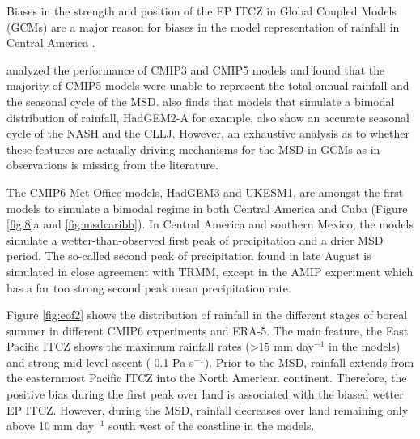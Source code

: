 Biases in the strength and position of the EP ITCZ in Global Coupled Models (GCMs) \citep{bellucci2010,li2014,schneider2014} are a major reason for biases in the model representation of rainfall in Central America  \citep{rauscher2008}. 

\cite{ryu2014} analyzed the performance of CMIP3 and CMIP5 models and found that the majority of CMIP5 models were unable to represent the total annual rainfall and the seasonal cycle of the MSD. \cite{ryu2014} also finds that models that simulate a bimodal distribution of rainfall, HadGEM2-A for example, also show an accurate seasonal cycle of the NASH and the CLLJ. However, an exhaustive analysis as to whether these features are actually driving mechanisms for the MSD in GCMs as in observations is missing from the literature. 


The CMIP6 Met Office models, HadGEM3 and UKESM1, are amongst the first models to simulate a bimodal regime in both Central America and Cuba (Figure \ref{fig:8}a and \ref{fig:msdcaribb}). 
In Central America and southern Mexico, the models simulate a wetter-than-observed first peak of precipitation and a drier MSD period.
% 
The so-called second peak of precipitation found in late August is simulated in close agreement with TRMM, except in the AMIP experiment which has a far too strong second peak mean precipitation rate.


Figure \ref{fig:eof2} shows the distribution of rainfall in the different stages of boreal summer in different CMIP6 experiments and ERA-5. 
The main feature, the East Pacific ITCZ shows the maximum rainfall rates (>15 mm day$^{-1}$ in the models) and strong mid-level ascent (-0.1 Pa s$^{-1}$). Prior to the MSD, rainfall extends from the easternmost Pacific ITCZ into the North American continent. Therefore, the positive bias during the first peak over land is associated with the biased wetter EP ITCZ.  However, during the MSD, rainfall decreases over land remaining only above 10 mm day$^{-1}$ south west of the coastline in the models.



